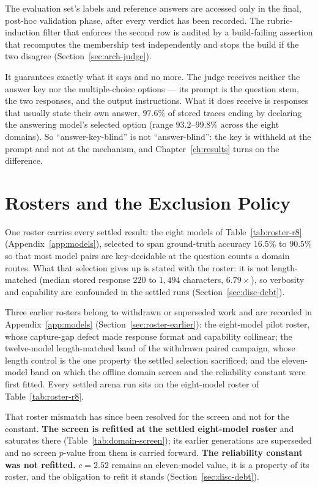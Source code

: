 The evaluation set's labels and reference answers are accessed only in
the final, post-hoc validation phase, after every verdict has been
recorded. The rubric-induction filter that enforces the second row is
audited by a build-failing assertion that recomputes the membership
test independently and stops the build if the two disagree
(Section~\ref{sec:arch-judge}).

It guarantees exactly what it says and no more. The judge receives
neither the answer key nor the multiple-choice options --- its prompt
is the question stem, the two responses, and the output instructions.
What it does receive is responses that usually state their own answer,
$97.6\%$ of stored traces ending by declaring the answering model's
selected option (range $93.2$--$99.8\%$ across the eight domains). So ``answer-key-blind'' is not ``answer-blind'': the
key is withheld at the prompt and not at the mechanism, and
Chapter~\ref{ch:results} turns on the difference.

\section{Rosters and the Exclusion Policy}\label{sec:exp-rosters}

One roster carries every settled result: the eight models of
Table~\ref{tab:roster-r8} (Appendix~\ref{app:models}), selected to
span ground-truth accuracy $16.5\%$ to $90.5\%$ so that most model
pairs are key-decidable at the question counts a domain routes. What
that selection gives up is stated with the roster: it is not
length-matched (median stored response $220$ to $1{,}494$ characters,
$6.79\times$), so verbosity and capability are confounded in the
settled runs (Section~\ref{sec:disc-debt}).

Three earlier rosters belong to withdrawn or superseded work and are
recorded in Appendix~\ref{app:models}
(Section~\ref{sec:roster-earlier}): the eight-model pilot roster,
whose capture-gap defect made response format and capability
collinear; the twelve-model length-matched band of the withdrawn
paired campaign, whose length control is the one property the settled
selection sacrificed; and the eleven-model band on which the offline
domain screen and the reliability constant were first fitted. Every
settled arena run sits on the eight-model roster of
Table~\ref{tab:roster-r8}.

That roster mismatch has since been resolved for the screen and not
for the constant. \textbf{The screen is refitted at the settled
eight-model roster} and saturates there
(Table~\ref{tab:domain-screen}); its earlier generations are
superseded and no screen $p$-value from them is carried forward.
\textbf{The reliability constant was not refitted.} $c = 2.52$
remains an eleven-model value, it is a property of its roster, and
the obligation to refit it stands (Section~\ref{sec:disc-debt}).

